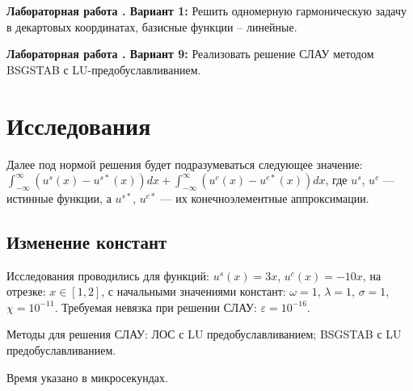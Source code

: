 \noindent\textbf{Лабораторная работа . Вариант 1:} Решить одномерную гармоническую задачу в декартовых координатах, базисные функции – линейные.

\noindent\textbf{Лабораторная работа . Вариант 9:} Реализовать решение СЛАУ методом BSGSTAB с LU-предобуславливанием.

\section{Исследования}

Далее под нормой решения будет подразумеваться следующее значение: $\int_{-\infty}^{\infty} (u^s(x)-u^{s*}(x)) dx + \int_{-\infty}^{\infty} (u^c(x)-u^{c*}(x)) dx$, где $u^s$, $u^c$ --- истинные функции, а $u^{s*}$, $u^{c*}$ --- их конечноэлементные аппроксимации.

\subsection{Изменение констант}

Исследования проводились для функций: $u^s(x) = 3x$, $u^c(x) = -10x$, на отрезке: $x \in [1, 2]$, с начальными значениями констант: $\omega=1$, $\lambda=1$, $\sigma=1$, $\chi=10^{-11}$. Требуемая невязка при решении СЛАУ: $\varepsilon=10^{-16}$. 

Методы для решения СЛАУ: ЛОС с LU предобуславливанием; BSGSTAB с LU предобуславливанием. 

Время указано в микросекундах.

\newcommand{\bigtable}[1]{
\begin{center}
\noindent\pgfplotstabletypeset[
	columns/param/.style={string type, column name={Параметр}},
	columns/los_norm/.style={column name={LOS норма}},
	columns/bsg_norm/.style={column name={BSG норма}},
	columns/los_time/.style={column name={\tcell{LOS\\время}}},
	columns/bsg_time/.style={column name={\tcell{BSG\\время}}},
	columns/los_iter/.style={column name={\tcell{LOS\\итераций}}},
	columns/bsg_iter/.style={column name={\tcell{BSG\\итераций}}, column type/.add={}{|},},
	every head row/.style={before row=\hline,after row=\hline\hline}, 
	every last row/.style={after row=\hline},
	column type/.add={|}{},
	col sep=tab,
]{#1.txt}
\end{center}
}

\newcommand{\bigtables}[1]{
\bigtable{#1_omega}
\bigtable{#1_lambda}
\bigtable{#1_sigma}
\bigtable{#1_xi}
}

